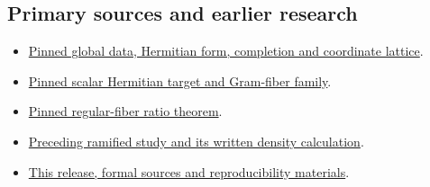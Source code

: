 \documentclass[12pt,letterpaper]{article}
\begin{document}
\subsection*{Primary sources and earlier research}
\begin{itemize}
\item \href{https://github.com/nousentllc/riemann-hypothesis/blob/40e56bab026552e089d7afcfeff08d2defb9c005/src/Formalism/SharpRestriction/GlobalSchurBounds/GeneralLinearActions/GenusMassVolumes.lean}{Pinned global data, Hermitian form, completion and coordinate lattice}.
\item \href{https://github.com/nousentllc/riemann-hypothesis/blob/40e56bab026552e089d7afcfeff08d2defb9c005/src/CompanionTheory/SpectralGeometry/CountingDefinitions/AdelicEulerProducts/IsEulerProd.lean}{Pinned scalar Hermitian target and Gram-fiber family}.
\item \href{https://github.com/nousentllc/riemann-hypothesis/blob/40e56bab026552e089d7afcfeff08d2defb9c005/src/CompanionTheory/SpectralGeometry/LocalGlobalProofs/AdelicAnalysis/LocalGramFiberRankOneSetFormula.lean#L310}{Pinned regular-fiber ratio theorem}.
\item \href{https://github.com/nousentllc/riemann-hypothesis/tree/b040ed9063835e90efdecd1e4350ed35708317c0/research/uriel/experiments/uncapped-growth}{Preceding ramified study and its written density calculation}.
\item \href{https://github.com/nousentllc/riemann-hypothesis/tree/experiments/uriel-ramified-lean-bridge/research/uriel/experiments/ramified-gram-bridge}{This release, formal sources and reproducibility materials}.
\end{itemize}
\end{document}
